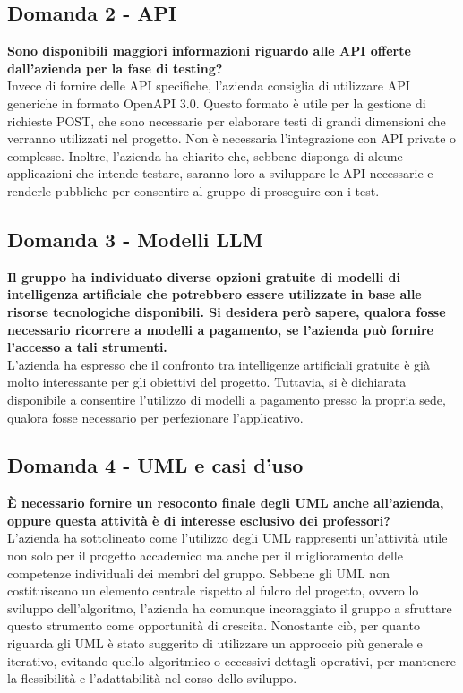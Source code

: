 \documentclass[10pt]{article}
\begin{document}
    \subsection{Domanda 2 - API}
    \textbf{Sono disponibili maggiori informazioni riguardo alle API offerte dall'azienda per la fase di testing?}  
    \\
    \textnormal{Invece di fornire delle API specifiche, l'azienda consiglia di utilizzare API generiche in formato OpenAPI 3.0. Questo formato è utile per la gestione di richieste POST, che sono necessarie per elaborare testi di grandi dimensioni che verranno utilizzati nel progetto. Non è necessaria l'integrazione con API private o complesse. Inoltre, l'azienda ha chiarito che, sebbene disponga di alcune applicazioni che intende testare, saranno loro a sviluppare le API necessarie e renderle pubbliche per consentire al gruppo di proseguire con i test.}

    \subsection{Domanda 3 - Modelli LLM}
    \textbf{Il gruppo ha individuato diverse opzioni gratuite di modelli di intelligenza artificiale che potrebbero essere utilizzate in base alle risorse tecnologiche disponibili. Si desidera però sapere, qualora fosse necessario ricorrere a modelli a pagamento, se l'azienda può fornire l'accesso a tali strumenti.}
    \\
    \textnormal{L’azienda ha espresso che il confronto tra intelligenze artificiali gratuite è già molto interessante per gli obiettivi del progetto. Tuttavia, si è dichiarata disponibile a consentire l’utilizzo di modelli a pagamento presso la propria sede, qualora fosse necessario per perfezionare l’applicativo.}
    
    \subsection{Domanda 4 - UML e casi d'uso}
    \textbf{È necessario fornire un resoconto finale degli UML anche all’azienda, oppure questa attività è di interesse esclusivo dei professori?}
    \\
    \textnormal{L’azienda ha sottolineato come l’utilizzo degli UML rappresenti un’attività utile non solo per il progetto accademico ma anche per il miglioramento delle competenze individuali dei membri del gruppo. Sebbene gli UML non costituiscano un elemento centrale rispetto al fulcro del progetto, ovvero lo sviluppo dell’algoritmo, l’azienda ha comunque incoraggiato il gruppo a sfruttare questo strumento come opportunità di crescita.
    Nonostante ciò, per quanto riguarda gli UML è stato suggerito di utilizzare un approccio più generale e iterativo, evitando quello algoritmico o eccessivi dettagli operativi, per mantenere la flessibilità e l’adattabilità nel corso dello sviluppo.}
    \newpage
    
\end{document}
